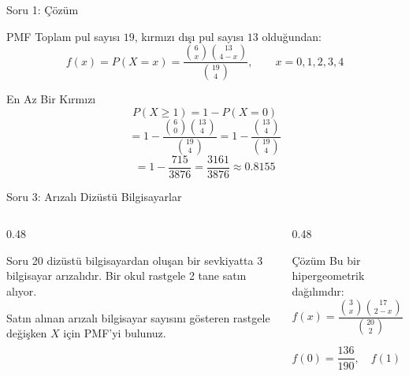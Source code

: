 \documentclass[light]{lutbeamer}
\begin{document}
\begin{frame}{Soru 1: Çözüm}
\scriptsize
\begin{block}{PMF}
    Toplam pul sayısı $19$, kırmızı dışı pul sayısı $13$ olduğundan:
    \[
    f(x)=P(X=x)=\frac{\binom{6}{x}\binom{13}{4-x}}{\binom{19}{4}},
    \qquad x=0,1,2,3,4
    \]
\end{block}

\begin{block}{En Az Bir Kırmızı}
    \[
    P(X \ge 1)=1-P(X=0)
    \]
    \[
    =1-\frac{\binom{6}{0}\binom{13}{4}}{\binom{19}{4}}
    =1-\frac{\binom{13}{4}}{\binom{19}{4}}
    \]
    \[
    =1-\frac{715}{3876}
    =\frac{3161}{3876}\approx 0.8155
    \]
\end{block}
\end{frame}

\begin{frame}{Soru 3: Arızalı Dizüstü Bilgisayarlar}
\scriptsize
\begin{columns}[T,onlytextwidth]
    \begin{column}{0.48\textwidth}
        \begin{block}{Soru}
            20 dizüstü bilgisayardan oluşan bir sevkiyatta 3 bilgisayar arızalıdır. Bir okul rastgele 2 tane satın alıyor.

            \vspace{0.15cm}
            Satın alınan arızalı bilgisayar sayısını gösteren rastgele değişken $X$ için PMF'yi bulunuz.
        \end{block}
    \end{column}
    \begin{column}{0.48\textwidth}
        \begin{exampleblock}{Çözüm}
            Bu bir hipergeometrik dağılımdır:
            \[
            f(x)=\frac{\binom{3}{x}\binom{17}{2-x}}{\binom{20}{2}},
            \qquad x=0,1,2
            \]

            \[
            f(0)=\frac{136}{190},\quad
            f(1)=\frac{51}{190},\quad
            f(2)=\frac{3}{190}
            \]
        \end{exampleblock}
    \end{column}
\end{columns}
\end{frame}
\end{document}

